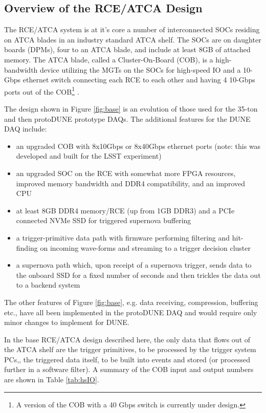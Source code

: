 \subsection{Overview of the RCE/ATCA Design }



The RCE/ATCA system is at it's core a number of interconnected SOCs residing on  ATCA blades in an industry standard ATCA shelf.   The SOCs are on daughter boards (DPMs),  four to an ATCA blade, and include at least 8GB of attached memory.  The ATCA blade, called a Cluster-On-Board (COB), is a high-bandwidth device utilizing the MGTs on the SOCs for high-speed IO and a 10-Gbps ethernet switch connecting each RCE to each other and having 4 10-Gbps ports out of the COB\footnote{A version of the COB with a 40 Gbps switch is currently under design.} .  


The design shown in Figure \ref{fig:base} is an evolution of those used for the 35-ton and then protoDUNE prototype DAQs.  The additional features for the DUNE DAQ include:
\begin{itemize}
    \item an upgraded COB with 8x10Gbps or 8x40Gbps ethernet ports (note:  this was developed and built for the LSST experiment) 
    \item an upgraded SOC on the RCE with somewhat more FPGA resources, improved memory bandwidth and DDR4 compatibility, and an improved CPU
    \item at least 8GB DDR4  memory/RCE (up from 1GB DDR3) and a PCIe connected NVMe SSD for triggered supernova buffering\cite{SNBuff}
    \item a trigger-primitive data path with firmware performing filtering and hit-finding on incoming wave-forms and streaming to a trigger decision cluster
    \item a supernova path which, upon receipt of a supernova trigger, sends data to the onboard SSD for a fixed number of seconds and then trickles the data out to a backend system
\end{itemize}
The other features of Figure \ref{fig:base}, e.g. data receiving, compression, buffering etc., have all been implemented in the protoDUNE DAQ and would require only minor changes to implement for DUNE.  

In the base RCE/ATCA design described here, the only data that flows out of the ATCA shelf are the trigger primitives, to be processed by the trigger system PCs,, the triggered data itself, to be built into events and stored (or processed further in a software filter).  A summary of the COB input and output numbers are shown in Table \ref{tab:hsIO}.  

